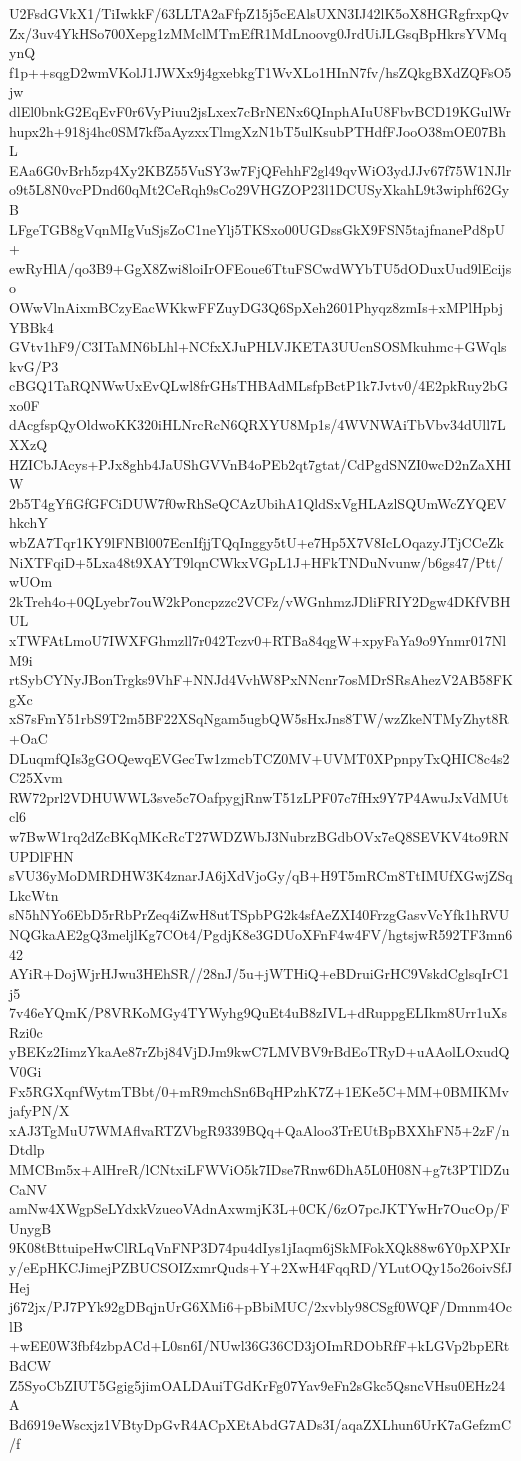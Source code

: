U2FsdGVkX1/TiIwkkF/63LLTA2aFfpZ15j5cEAlsUXN3IJ42lK5oX8HGRgfrxpQv
Zx/3uv4YkHSo700Xepg1zMMclMTmEfR1MdLnoovg0JrdUiJLGsqBpHkrsYVMqynQ
f1p++sqgD2wmVKolJ1JWXx9j4gxebkgT1WvXLo1HInN7fv/hsZQkgBXdZQFsO5jw
dlEl0bnkG2EqEvF0r6VyPiuu2jsLxex7cBrNENx6QInphAIuU8FbvBCD19KGulWr
hupx2h+918j4hc0SM7kf5aAyzxxTlmgXzN1bT5ulKsubPTHdfFJooO38mOE07BhL
EAa6G0vBrh5zp4Xy2KBZ55VuSY3w7FjQFehhF2gl49qvWiO3ydJJv67f75W1NJlr
o9t5L8N0vcPDnd60qMt2CeRqh9sCo29VHGZOP23l1DCUSyXkahL9t3wiphf62GyB
LFgeTGB8gVqnMIgVuSjsZoC1neYlj5TKSxo00UGDssGkX9FSN5tajfnanePd8pU+
ewRyHlA/qo3B9+GgX8Zwi8loiIrOFEoue6TtuFSCwdWYbTU5dODuxUud9lEcijso
OWwVlnAixmBCzyEacWKkwFFZuyDG3Q6SpXeh2601Phyqz8zmIs+xMPlHpbjYBBk4
GVtv1hF9/C3ITaMN6bLhl+NCfxXJuPHLVJKETA3UUcnSOSMkuhmc+GWqlskvG/P3
cBGQ1TaRQNWwUxEvQLwl8frGHsTHBAdMLsfpBctP1k7Jvtv0/4E2pkRuy2bGxo0F
dAcgfspQyOldwoKK320iHLNrcRcN6QRXYU8Mp1s/4WVNWAiTbVbv34dUll7LXXzQ
HZICbJAcys+PJx8ghb4JaUShGVVnB4oPEb2qt7gtat/CdPgdSNZI0wcD2nZaXHIW
2b5T4gYfiGfGFCiDUW7f0wRhSeQCAzUbihA1QldSxVgHLAzlSQUmWcZYQEVhkchY
wbZA7Tqr1KY9lFNBl007EcnIfjjTQqInggy5tU+e7Hp5X7V8IcLOqazyJTjCCeZk
NiXTFqiD+5Lxa48t9XAYT9lqnCWkxVGpL1J+HFkTNDuNvunw/b6gs47/Ptt/wUOm
2kTreh4o+0QLyebr7ouW2kPoncpzzc2VCFz/vWGnhmzJDliFRIY2Dgw4DKfVBHUL
xTWFAtLmoU7IWXFGhmzll7r042Tczv0+RTBa84qgW+xpyFaYa9o9Ynmr017NlM9i
rtSybCYNyJBonTrgks9VhF+NNJd4VvhW8PxNNcnr7osMDrSRsAhezV2AB58FKgXc
xS7sFmY51rbS9T2m5BF22XSqNgam5ugbQW5sHxJns8TW/wzZkeNTMyZhyt8R+OaC
DLuqmfQIs3gGOQewqEVGecTw1zmcbTCZ0MV+UVMT0XPpnpyTxQHIC8c4s2C25Xvm
RW72prl2VDHUWWL3sve5c7OafpygjRnwT51zLPF07c7fHx9Y7P4AwuJxVdMUtcl6
w7BwW1rq2dZcBKqMKcRcT27WDZWbJ3NubrzBGdbOVx7eQ8SEVKV4to9RNUPDlFHN
sVU36yMoDMRDHW3K4znarJA6jXdVjoGy/qB+H9T5mRCm8TtIMUfXGwjZSqLkcWtn
sN5hNYo6EbD5rRbPrZeq4iZwH8utTSpbPG2k4sfAeZXI40FrzgGasvVcYfk1hRVU
NQGkaAE2gQ3meljlKg7COt4/PgdjK8e3GDUoXFnF4w4FV/hgtsjwR592TF3mn642
AYiR+DojWjrHJwu3HEhSR//28nJ/5u+jWTHiQ+eBDruiGrHC9VskdCglsqIrC1j5
7v46eYQmK/P8VRKoMGy4TYWyhg9QuEt4uB8zIVL+dRuppgELIkm8Urr1uXsRzi0c
yBEKz2IimzYkaAe87rZbj84VjDJm9kwC7LMVBV9rBdEoTRyD+uAAolLOxudQV0Gi
Fx5RGXqnfWytmTBbt/0+mR9mchSn6BqHPzhK7Z+1EKe5C+MM+0BMIKMvjafyPN/X
xAJ3TgMuU7WMAflvaRTZVbgR9339BQq+QaAloo3TrEUtBpBXXhFN5+2zF/nDtdlp
MMCBm5x+AlHreR/lCNtxiLFWViO5k7IDse7Rnw6DhA5L0H08N+g7t3PTlDZuCaNV
amNw4XWgpSeLYdxkVzueoVAdnAxwmjK3L+0CK/6zO7pcJKTYwHr7OucOp/FUnygB
9K08tBttuipeHwClRLqVnFNP3D74pu4dIys1jIaqm6jSkMFokXQk88w6Y0pXPXIr
y/eEpHKCJimejPZBUCSOIZxmrQuds+Y+2XwH4FqqRD/YLutOQy15o26oivSfJHej
j672jx/PJ7PYk92gDBqjnUrG6XMi6+pBbiMUC/2xvbly98CSgf0WQF/Dmnm4OclB
+wEE0W3fbf4zbpACd+L0sn6I/NUwl36G36CD3jOImRDObRfF+kLGVp2bpERtBdCW
Z5SyoCbZIUT5Ggig5jimOALDAuiTGdKrFg07Yav9eFn2sGkc5QsncVHsu0EHz24A
Bd6919eWscxjz1VBtyDpGvR4ACpXEtAbdG7ADs3I/aqaZXLhun6UrK7aGefzmC/f

